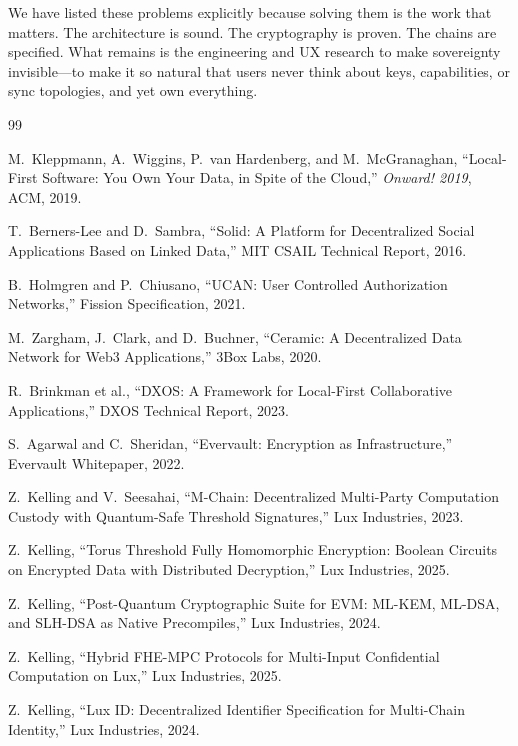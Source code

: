 We have listed these problems explicitly because solving them is the work
that matters. The architecture is sound. The cryptography is proven. The
chains are specified. What remains is the engineering and UX research to
make sovereignty invisible---to make it so natural that users never think
about keys, capabilities, or sync topologies, and yet own everything.


\begin{thebibliography}{99}

M.~Kleppmann, A.~Wiggins, P.~van Hardenberg, and M.~McGranaghan,
``Local-First Software: You Own Your Data, in Spite of the Cloud,''
\textit{Onward! 2019}, ACM, 2019.

T.~Berners-Lee and D.~Sambra,
``Solid: A Platform for Decentralized Social Applications Based on Linked Data,''
MIT CSAIL Technical Report, 2016.

B.~Holmgren and P.~Chiusano,
``UCAN: User Controlled Authorization Networks,''
Fission Specification, 2021.

M.~Zargham, J.~Clark, and D.~Buchner,
``Ceramic: A Decentralized Data Network for Web3 Applications,''
3Box Labs, 2020.

R.~Brinkman et al.,
``DXOS: A Framework for Local-First Collaborative Applications,''
DXOS Technical Report, 2023.

S.~Agarwal and C.~Sheridan,
``Evervault: Encryption as Infrastructure,''
Evervault Whitepaper, 2022.

Z.~Kelling and V.~Seesahai,
``M-Chain: Decentralized Multi-Party Computation Custody with Quantum-Safe Threshold Signatures,''
Lux Industries, 2023.

Z.~Kelling,
``Torus Threshold Fully Homomorphic Encryption: Boolean Circuits on Encrypted Data with Distributed Decryption,''
Lux Industries, 2025.

Z.~Kelling,
``Post-Quantum Cryptographic Suite for EVM: ML-KEM, ML-DSA, and SLH-DSA as Native Precompiles,''
Lux Industries, 2024.

Z.~Kelling,
``Hybrid FHE-MPC Protocols for Multi-Input Confidential Computation on Lux,''
Lux Industries, 2025.

Z.~Kelling,
``Lux ID: Decentralized Identifier Specification for Multi-Chain Identity,''
Lux Industries, 2024.


\end{thebibliography}
